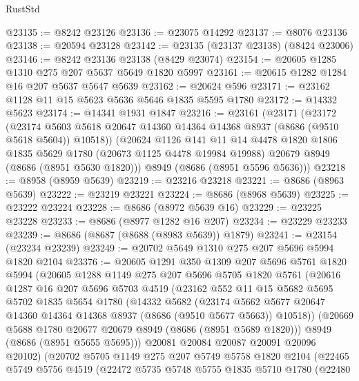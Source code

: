 \begin{lexlean}{RustStd}
\begin{coremodule}
@23135 := @8242 @23126
@23136 := @23075 @14292
@23137 := @8076 @23136
@23138 := @20594 @23128
@23142 := @23135 (@23137 @23138) (@8424 @23006)
@23146 := @8242 @23136 @23138 (@8429 @23074)
@23154 := @20605 @1285 @1310 @275 @207 @5637 @5649 @1820 @5997
@23161 := @20615 @1282 @1284 @16 @207 @5637 @5647 @5639
@23162 := @20624 @596
@23171 := @23162 @1128 @11 @15 @5623 @5636 @5646 @1835 @5595 @1780
@23172 := @14332 @5623
@23174 := @14341 @1931 @1847
@23216 := @23161
    (@23171
      (@23172
        (@23174 @5603 @5618 @20647 @14360 @14364 @14368 @8937 (@8686 (@9510 @5618 @5604)) @10518))
      (@20624
        @1126
        @141
        @11
        @14
        @4478
        @1820
        @1806
        @1835
        @5629
        @1780
        (@20673 @1125 @4478 @19984 @19988)
        @20679
        @8949
        (@8686 (@8951 @5630 @1820)))
      @8949
      (@8686 (@8951 @5596 @5636)))
@23218 := @8958 (@8959 @5639)
@23219 := @23216 @23218
@23221 := @8686 (@8963 @5639)
@23222 := @23219 @23221
@23224 := @8686 (@8968 @5639)
@23225 := @23222 @23224
@23228 := @8686 (@8972 @5639 @16)
@23229 := @23225 @23228
@23233 := @8686 (@8977 @1282 @16 @207)
@23234 := @23229 @23233
@23239 := @8686 (@8687 (@8688 (@8983 @5639)) @1879)
@23241 := @23154 (@23234 @23239)
@23249 := @20702 @5649 @1310 @275 @207 @5696 @5994 @1820 @2104
@23376 := @20605
    @1291
    @350
    @1309
    @207
    @5696
    @5761
    @1820
    @5994
    (@20605
      @1288
      @1149
      @275
      @207
      @5696
      @5705
      @1820
      @5761
      (@20616
        @1287
        @16
        @207
        @5696
        @5703
        @4519
        (@23162
          @552
          @11
          @15
          @5682
          @5695
          @5702
          @1835
          @5654
          @1780
          (@14332
            @5682
            (@23174
              @5662
              @5677
              @20647
              @14360
              @14364
              @14368
              @8937
              (@8686 (@9510 @5677 @5663))
              @10518))
          (@20669 @5688 @1780 @20677 @20679 @8949 (@8686 (@8951 @5689 @1820)))
          @8949
          (@8686 (@8951 @5655 @5695)))
        @20081
        @20084
        @20087
        @20091
        @20096
        @20102)
      (@20702
        @5705
        @1149
        @275
        @207
        @5749
        @5758
        @1820
        @2104
        (@22465
          @5749
          @5756
          @4519
          (@22472
            @5735
            @5748
            @5755
            @1835
            @5710
            @1780
            (@22480

\end{coremodule}
\end{lexlean}
